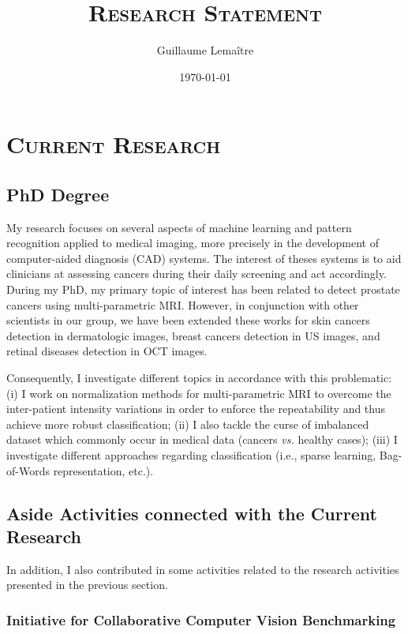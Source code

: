 \documentclass[a4paper]{article}
\title{\textbf{\textsc{Research Statement}}}
\author{Guillaume Lema\^itre}
\date{\today}
\begin{document}
\fontsize{12}{15}
\selectfont
\maketitle

\section{\textsc{Current Research}}

\subsection{PhD Degree}

My research focuses on several aspects of machine learning and pattern recognition applied to medical imaging, more precisely in the development of computer-aided diagnosis (CAD) systems.
The interest of theses systems is to aid clinicians at assessing cancers during their daily screening and act accordingly. 
During my PhD, my primary topic of interest has been related to detect prostate cancers using multi-parametric MRI.
However, in conjunction with other scientists in our group, we have been extended these works for skin cancers detection in dermatologic images, breast cancers detection in US images, and retinal diseases detection in OCT images.

Consequently, I investigate different topics in accordance with this problematic: (i) I work on normalization methods for multi-parametric MRI to overcome the inter-patient intensity variations in order to enforce the repeatability and thus achieve more robust classification; (ii) I also tackle the curse of imbalanced dataset which commonly occur in medical data (cancers \textit{vs.} healthy cases); (iii) I investigate different approaches regarding classification (i.e., sparse learning, Bag-of-Words representation, etc.).

\subsection{Aside Activities connected with the Current Research}

In addition, I also contributed in some activities related to the research activities presented in the previous section.

\subsubsection{Initiative for Collaborative Computer Vision Benchmarking}
\end{document}
